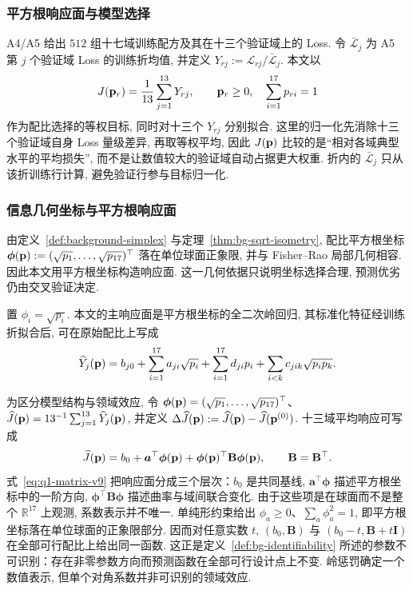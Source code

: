 \subsubsection{平方根响应面与模型选择}

A4/A5 给出 $512$ 组十七域训练配方及其在十三个验证域上的 Loss. 令 $\bar{\mathcal L}_j$ 为 A5 第 $j$ 个验证域 Loss 的训练折均值, 并定义 $Y_{rj}:=\mathcal L_{rj}/\bar{\mathcal L}_j$. 本文以
\begin{equation}\label{eq:objective}
J(\mathbf p_r)=\frac1{13}\sum_{j=1}^{13}Y_{rj}, \qquad
\mathbf p_r\ge0, \quad\sum_{i=1}^{17}p_{ri}=1
\end{equation}
作为配比选择的等权目标, 同时对十三个 $Y_{rj}$ 分别拟合. 这里的归一化先消除十三个验证域自身 Loss 量级差异, 再取等权平均, 因此 $J(\mathbf p)$ 比较的是“相对各域典型水平的平均损失”, 而不是让数值较大的验证域自动占据更大权重. 折内的 $\bar{\mathcal L}_j$ 只从该折训练行计算, 避免验证行参与目标归一化. 


\subsubsection{信息几何坐标与平方根响应面}

由定义~\ref{def:background-simplex} 与定理~\ref{thm:bg-sqrt-isometry}, 配比平方根坐标
$\boldsymbol\phi(\mathbf p):=(\sqrt{p_1}, \ldots, \sqrt{p_{17}})^\top$
落在单位球面正象限, 并与 Fisher--Rao 局部几何相容. 因此本文用平方根坐标构造响应面. 这一几何依据只说明坐标选择合理, 预测优劣仍由交叉验证决定. 

置 $\phi_i=\sqrt{p_i}$. 本文的主响应面是平方根坐标的全二次岭回归, 其标准化特征经训练折拟合后, 可在原始配比上写成
\begin{equation}\label{eq:sqrtquad}
\widehat Y_j(\mathbf p)=b_{j0}
 +\sum_{i=1}^{17}a_{ji}\sqrt{p_i}
 +\sum_{i=1}^{17}d_{ji}p_i
 +\sum_{i<k}c_{jik}\sqrt{p_i p_k}.
\end{equation}

为区分模型结构与领域效应, 令 $\boldsymbol\phi(\mathbf p)=(\sqrt{p_1}, \ldots, \sqrt{p_{17}})^\top$、$\widehat J(\mathbf p)=13^{-1}\sum_{j=1}^{13}\widehat Y_j(\mathbf p)$, 并定义 $\Delta\widehat J(\mathbf p):=\widehat J(\mathbf p)-\widehat J(\mathbf p^{(0)})$. 十三域平均响应可写成
\begin{equation}\label{eq:q1-matrix-v9}
\widehat J(\mathbf p)=b_0+\boldsymbol a^\top\boldsymbol\phi(\mathbf p)
+\boldsymbol\phi(\mathbf p)^\top\mathbf B\boldsymbol\phi(\mathbf p), \qquad \mathbf B=\mathbf B^\top.
\end{equation}
式~\eqref{eq:q1-matrix-v9} 把响应面分成三个层次：$b_0$ 是共同基线, $\boldsymbol a^\top\boldsymbol\phi$ 描述平方根坐标中的一阶方向, $\boldsymbol\phi^\top\mathbf B\boldsymbol\phi$ 描述曲率与域间联合变化. 由于这些项是在球面而不是整个 $\mathbb R^{17}$ 上观测, 系数表示并不唯一. 单纯形约束给出 $\phi_a\ge0$、$\sum_a\phi_a^2=1$, 即平方根坐标落在单位球面的正象限部分. 因而对任意实数 $t$, $(b_0, \mathbf B)$ 与 $(b_0-t, \mathbf B+t\mathbf I)$ 在全部可行配比上给出同一函数. 这正是定义~\ref{def:bg-identifiability} 所述的参数不可识别：存在非零参数方向而预测函数在全部可行设计点上不变. 岭惩罚确定一个数值表示, 但单个对角系数并非可识别的领域效应. 

